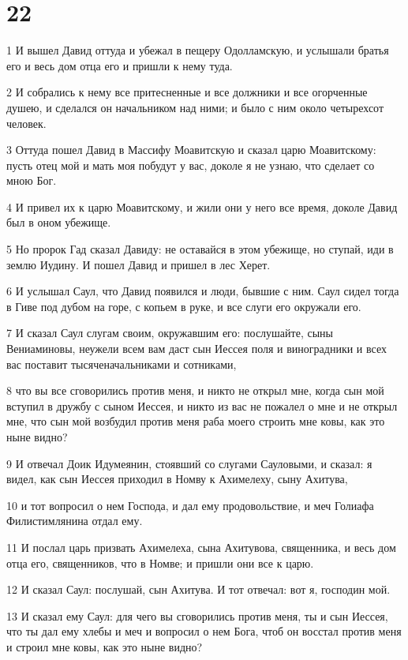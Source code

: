 \chapter{22}

\par 1 И вышел Давид оттуда и убежал в пещеру Одолламскую, и услышали братья его и весь дом отца его и пришли к нему туда.
\par 2 И собрались к нему все притесненные и все должники и все огорченные душею, и сделался он начальником над ними; и было с ним около четырехсот человек.
\par 3 Оттуда пошел Давид в Массифу Моавитскую и сказал царю Моавитскому: пусть отец мой и мать моя побудут у вас, доколе я не узнаю, что сделает со мною Бог.
\par 4 И привел их к царю Моавитскому, и жили они у него все время, доколе Давид был в оном убежище.
\par 5 Но пророк Гад сказал Давиду: не оставайся в этом убежище, но ступай, иди в землю Иудину. И пошел Давид и пришел в лес Херет.
\par 6 И услышал Саул, что Давид появился и люди, бывшие с ним. Саул сидел тогда в Гиве под дубом на горе, с копьем в руке, и все слуги его окружали его.
\par 7 И сказал Саул слугам своим, окружавшим его: послушайте, сыны Вениаминовы, неужели всем вам даст сын Иессея поля и виноградники и всех вас поставит тысяченачальниками и сотниками,
\par 8 что вы все сговорились против меня, и никто не открыл мне, когда сын мой вступил в дружбу с сыном Иессея, и никто из вас не пожалел о мне и не открыл мне, что сын мой возбудил против меня раба моего строить мне ковы, как это ныне видно?
\par 9 И отвечал Доик Идумеянин, стоявший со слугами Сауловыми, и сказал: я видел, как сын Иессея приходил в Номву к Ахимелеху, сыну Ахитува,
\par 10 и тот вопросил о нем Господа, и дал ему продовольствие, и меч Голиафа Филистимлянина отдал ему.
\par 11 И послал царь призвать Ахимелеха, сына Ахитувова, священника, и весь дом отца его, священников, что в Номве; и пришли они все к царю.
\par 12 И сказал Саул: послушай, сын Ахитува. И тот отвечал: вот я, господин мой.
\par 13 И сказал ему Саул: для чего вы сговорились против меня, ты и сын Иессея, что ты дал ему хлебы и меч и вопросил о нем Бога, чтоб он восстал против меня и строил мне ковы, как это ныне видно?
